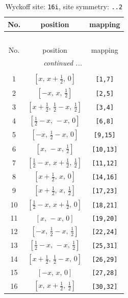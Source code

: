 \documentclass[fleqn,8pt]{jsarticle}
\begin{document}
\begin{longtable}{ccc}
\caption{Wyckoff site: {\tt 16i}, site symmetry: {\tt ..2}}
 \\
 \hline \hline
No. & position & mapping \\ \hline \endfirsthead

\multicolumn{2}{l}{\tablename\ \thetable{}} \\
 \hline \hline
No. & position & mapping \\ \hline \endhead

 \hline \hline
\multicolumn{2}{r}{\footnotesize\it continued ...} \\ \endfoot

 \hline \hline
\multicolumn{2}{r}{} \\ \endlastfoot

1 & $\left[ x,\, x + \frac{1}{2},\, 0 \right]$ & {\tt [1,7]} \\ \hline
2 & $\left[ - x,\, x,\, \frac{1}{2} \right]$ & {\tt [2,5]} \\ \hline
3 & $\left[ x + \frac{1}{2},\, \frac{1}{2} - x,\, \frac{1}{2} \right]$ & {\tt [3,4]} \\ \hline
4 & $\left[ \frac{1}{2} - x,\, - x,\, 0 \right]$ & {\tt [6,8]} \\ \hline
5 & $\left[ - x,\, \frac{1}{2} - x,\, 0 \right]$ & {\tt [9,15]} \\ \hline
6 & $\left[ x,\, - x,\, \frac{1}{2} \right]$ & {\tt [10,13]} \\ \hline
7 & $\left[ \frac{1}{2} - x,\, x + \frac{1}{2},\, \frac{1}{2} \right]$ & {\tt [11,12]} \\ \hline
8 & $\left[ x + \frac{1}{2},\, x,\, 0 \right]$ & {\tt [14,16]} \\ \hline
9 & $\left[ x + \frac{1}{2},\, x,\, \frac{1}{2} \right]$ & {\tt [17,23]} \\ \hline
10 & $\left[ \frac{1}{2} - x,\, x + \frac{1}{2},\, 0 \right]$ & {\tt [18,21]} \\ \hline
11 & $\left[ x,\, - x,\, 0 \right]$ & {\tt [19,20]} \\ \hline
12 & $\left[ - x,\, \frac{1}{2} - x,\, \frac{1}{2} \right]$ & {\tt [22,24]} \\ \hline
13 & $\left[ \frac{1}{2} - x,\, - x,\, \frac{1}{2} \right]$ & {\tt [25,31]} \\ \hline
14 & $\left[ x + \frac{1}{2},\, \frac{1}{2} - x,\, 0 \right]$ & {\tt [26,29]} \\ \hline
15 & $\left[ - x,\, x,\, 0 \right]$ & {\tt [27,28]} \\ \hline
16 & $\left[ x,\, x + \frac{1}{2},\, \frac{1}{2} \right]$ & {\tt [30,32]} \\
\end{longtable}
\end{document}
